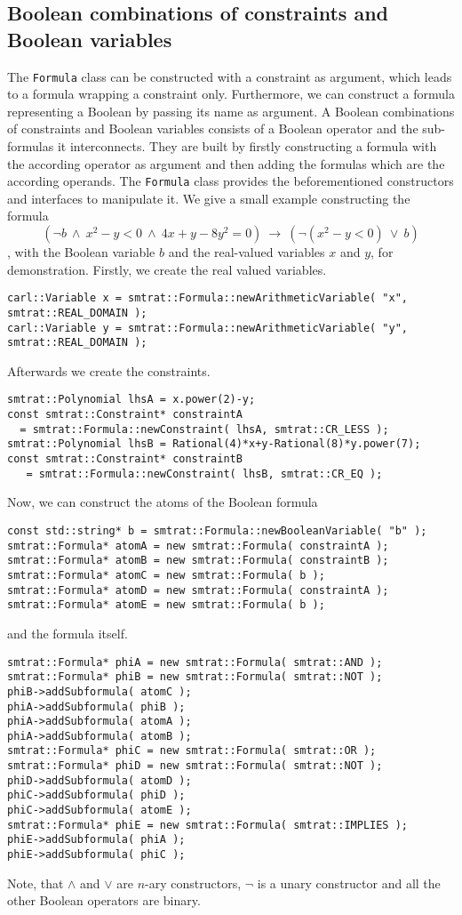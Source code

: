 \subsection{Boolean combinations of constraints and Boolean variables}
The \texttt{Formula} class can be constructed with a constraint as argument, which leads to a formula wrapping a constraint only. Furthermore, we can construct a formula representing a Boolean by passing its name as argument. A Boolean combinations of constraints and Boolean variables consists of a Boolean operator and the sub-formulas it interconnects. They are built by firstly constructing a formula with the according operator as argument and then adding the formulas which are the according operands. The \texttt{Formula} class provides the beforementioned constructors and interfaces to manipulate it. We give a small example constructing the formula \[(\neg b\ \land\ x^2-y<0\ \land\ 4x+y-8y^2=0 )\ \rightarrow\ (\neg(x^2-y<0)\ \lor\ b )\]
, with the Boolean variable $b$ and the real-valued variables $x$ and $y$, for demonstration. Firstly, we create the real valued variables.
\scriptsize
\begin{verbatim}
carl::Variable x = smtrat::Formula::newArithmeticVariable( "x", smtrat::REAL_DOMAIN );
carl::Variable y = smtrat::Formula::newArithmeticVariable( "y", smtrat::REAL_DOMAIN );
\end{verbatim}
\normalsize
Afterwards we create the constraints.
\scriptsize
\begin{verbatim}
smtrat::Polynomial lhsA = x.power(2)-y;
const smtrat::Constraint* constraintA 
  = smtrat::Formula::newConstraint( lhsA, smtrat::CR_LESS );
smtrat::Polynomial lhsB = Rational(4)*x+y-Rational(8)*y.power(7);
const smtrat::Constraint* constraintB
   = smtrat::Formula::newConstraint( lhsB, smtrat::CR_EQ );
\end{verbatim}
\normalsize
Now, we can construct the atoms of the Boolean formula
\scriptsize
\begin{verbatim}
const std::string* b = smtrat::Formula::newBooleanVariable( "b" );
smtrat::Formula* atomA = new smtrat::Formula( constraintA );
smtrat::Formula* atomB = new smtrat::Formula( constraintB );
smtrat::Formula* atomC = new smtrat::Formula( b );
smtrat::Formula* atomD = new smtrat::Formula( constraintA );
smtrat::Formula* atomE = new smtrat::Formula( b );
\end{verbatim}
\normalsize
and the formula itself.
\scriptsize
\begin{verbatim}
smtrat::Formula* phiA = new smtrat::Formula( smtrat::AND );
smtrat::Formula* phiB = new smtrat::Formula( smtrat::NOT );
phiB->addSubformula( atomC );
phiA->addSubformula( phiB );
phiA->addSubformula( atomA );
phiA->addSubformula( atomB );
smtrat::Formula* phiC = new smtrat::Formula( smtrat::OR );
smtrat::Formula* phiD = new smtrat::Formula( smtrat::NOT );
phiD->addSubformula( atomD );
phiC->addSubformula( phiD );
phiC->addSubformula( atomE );
smtrat::Formula* phiE = new smtrat::Formula( smtrat::IMPLIES );
phiE->addSubformula( phiA );
phiE->addSubformula( phiC );
\end{verbatim}
\normalsize
Note, that $\land$ and $\lor$ are $n$-ary constructors, $\neg$ is a unary constructor and all the other Boolean operators are binary.

